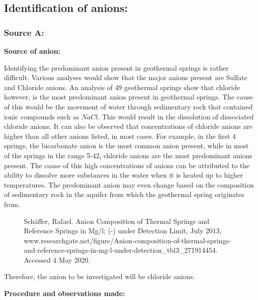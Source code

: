 \documentclass[11pt, a4]{article}
\begin{document}
		\subsection{Identification of anions:}
				\subsubsection{Source A:}				
					\textbf{Source of anion:}

					Identifying the predominant anion present in geothermal springs is rather difficult. Various analyses would show that the major anions present are Sulfate and Chloride anions. An analysis of 49 geothermal springs show that chloride however, is the most predominant anion present in geothermal springs. The cause of this would be the movement of water through sedimentary rock that contained ionic compounds such as $NaCl$. This would result in the dissolution of dissociated chloride anions. It can also be observed that concentrations of chloride anions are higher than all other anions listed, in most cases. For example, in the first 4 springs, the bicarbonate anion is the most common anion present, while in most of the springs in the range 5-42, chloride anions are the most predominant anions present. The cause of this high concentrations of anions can be attributed to the ability to dissolve more substances in the water when it is heated up to higher temperatures. The predominant anion may even change based on the composition of sedimentary rock in the aquifer from which the geothermal spring originates from.
					
				
					\begin{figure}[H]
						\begin{center}
						\end{center}
						\caption{Schäffer, Rafael. Anion Composition of Thermal Springs and Reference Springs in Mg/l; (-) under Detection Limit, July 2013, www.researchgate.net/figure/Anion-composition-of-thermal-springs-and-reference-springs-in-mg-l-under-detection\_tbl3\_271914454. Accessed 4 May 2020.}
					\end{figure}
					
					Therefore, the anion to be investigated will be chloride anions.

					\noindent \textbf{Procedure and observations made:}
\end{document}
